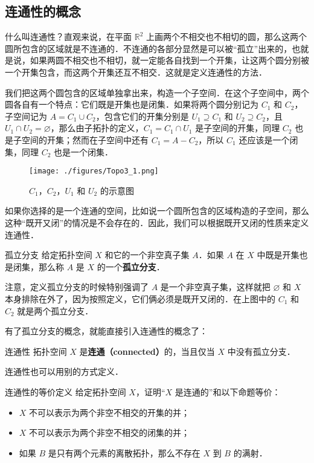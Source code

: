 

\subsection{连通性的概念}
什么叫连通性？直观来说，在平面 $\mathbb{R}^2$ 上画两个不相交也不相切的圆，那么这两个圆所包含的区域就是不连通的．不连通的各部分显然是可以被“孤立”出来的，也就是说，如果两圆不相交也不相切，就一定能各自找到一个开集，让这两个圆分别被一个开集包含，而这两个开集还互不相交．这就是定义连通性的方法．

我们把这两个圆包含的区域单独拿出来，构造一个子空间．在这个子空间中，两个圆各自有一个特点：它们既是开集也是闭集．如果将两个圆分别记为 $C_1$ 和 $C_2$，子空间记为 $A=C_1\cup C_2$，包含它们的开集分别是 $U_1\supseteq C_1$ 和 $U_2\supseteq C_2$，且 $U_1\cap U_2=\varnothing$，那么由子拓扑的定义，$C_1=C_1\cap U_1$ 是子空间的开集，同理 $C_2$ 也是子空间的开集；然而在子空间中还有 $C_1=A-C_2$，所以 $C_1$ 还应该是一个闭集，同理 $C_2$ 也是一个闭集．

\begin{figure}[ht]
\centering
\texttt{[image: ./figures/Topo3\_1.png]}
\caption{$C_1$，$C_2$，$U_1$ 和 $U_2$ 的示意图} \label{Topo3_fig1}
\end{figure}

如果你选择的是一个连通的空间，比如说一个圆所包含的区域构造的子空间，那么这种“既开又闭”的情况是不会存在的．因此，我们可以根据既开又闭的性质来定义连通性．

\begin{definition}{孤立分支}
给定拓扑空间 $X$ 和它的一个非空真子集 $A$．如果 $A$ 在 $X$ 中既是开集也是闭集，那么称 $A$ 是 $X$ 的一个\textbf{孤立分支}．
\end{definition}

注意，定义孤立分支的时候特别强调了 $A$ 是一个非空真子集，这样就把 $\varnothing$ 和 $X$ 本身排除在外了，因为按照定义，它们俩必须是既开又闭的．在上图中的 $C_1$ 和 $C_2$ 就是两个孤立分支．

有了孤立分支的概念，就能直接引入连通性的概念了：

\begin{definition}{连通性}
拓扑空间 $X$ 是\textbf{连通（connected）}的，当且仅当 $X$ 中没有孤立分支．
\end{definition}

连通性也可以用别的方式定义．

\begin{exercise}{连通性的等价定义}\label{Topo3_exe1}
给定拓扑空间 $X$，证明“$X$ 是连通的”和以下命题等价：
\begin{itemize}
\item $X$ 不可以表示为两个非空不相交的开集的并；
\item $X$ 不可以表示为两个非空不相交的闭集的并；
\item 如果 $B$ 是只有两个元素的离散拓扑，那么不存在 $X$ 到 $B$ 的满射．

\end{itemize}
\end{exercise}

